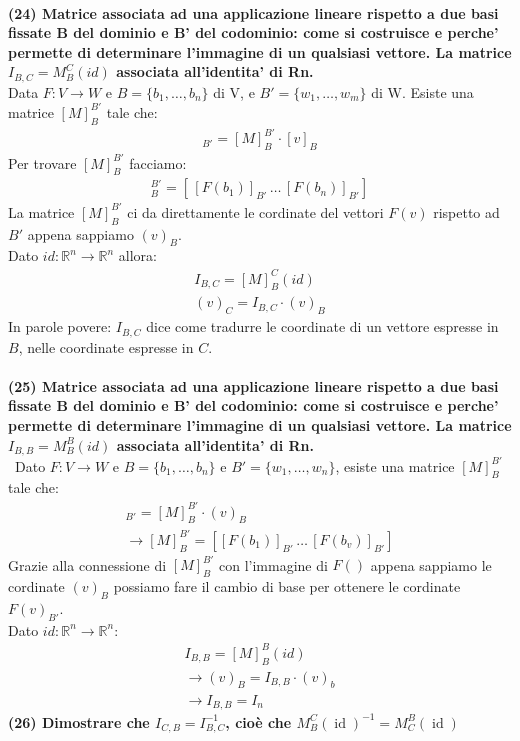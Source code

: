 \documentclass[10pt]{extarticle}
\begin{document}
\vspace{1em}\\
\textbf{(24) Matrice associata ad una applicazione lineare rispetto a due basi fissate B del dominio e B' del codominio: come si costruisce e perche' permette di determinare l'immagine di un qualsiasi vettore. La matrice $I_{B,C} = M_B^C(id)$ associata all’identita' di Rn.}\\
Data $F : V \to W$ e $B=\{b_1,\dots,b_n\}$ di V, e $B'=\{w_1,\dots,w_m\}$ di W. Esiste una matrice $[M]_B^{B'}$ tale che:
\begin{align*}
    [F(v)]_{B'}=[M]_{B}^{B'}\cdot [v]_B
\end{align*}
Per trovare $[M]_B ^{B'}$ facciamo:
\begin{align*}
    [M]_B^{B'}=[ \, [F(b_1)]_{B'} \, \dots \, [F(b_n)]_{B'}]
\end{align*}
La matrice $[M]_{B}^{B'}$ ci da direttamente le cordinate del vettori $F(v)$ rispetto ad $B'$ appena sappiamo $(v)_B$. \\
Dato $id : \mathbb{R}^n \to \mathbb{R}^n$ allora:
\begin{align*}
    I_{B,C}=[M]_B^C(id) \\
    (v)_C = I_{B,C} \cdot (v)_B
\end{align*}
In parole povere: $I_{B,C}$ dice come tradurre le coordinate di un vettore espresse in $B$, nelle coordinate espresse in $C$. \\
\vspace{1em} \\
\textbf{(25) Matrice associata ad una applicazione lineare rispetto a due basi fissate B del dominio e
B' del codominio: come si costruisce e perche' permette di determinare l'immagine di un
qualsiasi vettore. La matrice $I_{B,B} = M_B^B (id)$ associata all'identita' di Rn.} \\\
Dato $F : V \to W$ e $B=\{b_1,\dots,b_n\}$ e $B'=\{w_1,\dots,w_n\}$, esiste una matrice $[M]_B^{B'}$ tale che:
\begin{align*}
    [F(v)]_{B'}=[M]_B^{B'} \cdot (v)_B \\
    \to [M]_B^{B'}=[[F(b_1)]_{B'} \, \dots \, [F(b_v)]_{B'}]
\end{align*}
Grazie alla connessione di $[M]_B^{B'}$ con l'immagine di $F()$ appena sappiamo le cordinate $(v)_B$ possiamo fare il cambio di base per ottenere le cordinate $F(v)_{B'}$.\\
Dato $id : \mathbb{R}^n \to \mathbb{R}^n$:
\begin{align*}
    I_{B,B}=[M]_B^B(id) \\
    \to (v)_B = I_{B,B} \cdot (v)_b \\
    \to I_{B,B}=I_n
\end{align*} 
\vspace{1em} 
\textbf{(26) Dimostrare che \( I_{C,B} = I_{B,C}^{-1} \), cioè che \( M_B^C(\operatorname{id})^{-1} = M_C^B(\operatorname{id}) \)}
\end{document}

